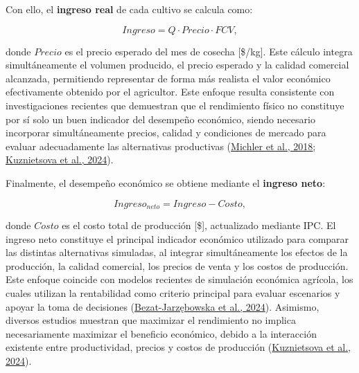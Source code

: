 \documentclass[12pt]{report}
\newcommand{\citeref}[2]{\hyperlink{ref:#1}{#2}}
\begin{document}
\vspace{0.2cm}

Con ello, el \textbf{ingreso real} de cada cultivo se calcula como:

\vspace{0.2cm}

\begin{equation}
Ingreso = Q \cdot Precio \cdot FCV,
\end{equation}

\vspace{0.2cm}

donde $Precio$ es el precio esperado del mes de cosecha [\$/kg]. Este cálculo integra simultáneamente el volumen producido, el precio esperado y la calidad comercial alcanzada, permitiendo representar de forma más realista el valor económico efectivamente obtenido por el agricultor. Este enfoque resulta consistente con investigaciones recientes que demuestran que el rendimiento físico no constituye por sí solo un buen indicador del desempeño económico, siendo necesario incorporar simultáneamente precios, calidad y condiciones de mercado para evaluar adecuadamente las alternativas productivas (\citeref{michler2019}{Michler et al., 2018}; \citeref{kuznietsova2024}{Kuznietsova et al., 2024}).

\vspace{0.2cm}

Finalmente, el desempeño económico se obtiene mediante el \textbf{ingreso neto}:

\vspace{0.2cm}

\begin{equation}
Ingreso_{neto} = Ingreso - Costo,
\end{equation}

\vspace{0.2cm}

donde $Costo$ es el costo total de producción [\$], actualizado mediante IPC. El ingreso neto constituye el principal indicador económico utilizado para comparar las distintas alternativas simuladas, al integrar simultáneamente los efectos de la producción, la calidad comercial, los precios de venta y los costos de producción. Este enfoque coincide con modelos recientes de simulación económica agrícola, los cuales utilizan la rentabilidad como criterio principal para evaluar escenarios y apoyar la toma de decisiones (\citeref{bezat2024}{Bezat-Jarzębowska et al., 2024}). Asimismo, diversos estudios muestran que maximizar el rendimiento no implica necesariamente maximizar el beneficio económico, debido a la interacción existente entre productividad, precios y costos de producción (\citeref{kuznietsova2024}{Kuznietsova et al., 2024}).
\end{document}
